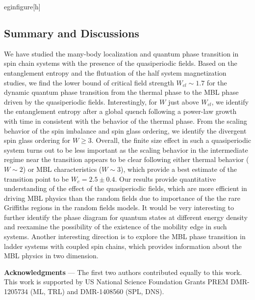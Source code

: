 \documentclass[prl,aps,epsf,showpacs,twocolumn,letterpaper]{revtex4}
\begin{document}
egin{figure}[h]

\subsection{Summary and Discussions}

We have studied the many-body localization and quantum phase transition in spin chain systems with the presence of the quasiperiodic fields.    
Based on the entanglement entropy and the flutuation of the half system magnetization studies, 
we find the lower bound of critical field strength $W_{cl}\sim 1.7$ for 
the dynamic quantum phase  transition from the thermal phase 
to the MBL phase  driven by the quasiperiodic fields. Interestingly,   for $W$ just above $W_{cl}$, we identify the
entanglement entropy after a global quench following a power-law growth with time in consistent with the behavior of the
thermal phase.   From the scaling behavior of the spin imbalance and spin glass ordering, 
we identify the divergent spin glass ordering for $W\geq 3$.    Overall, the finite size effect in such a quasiperiodic system turns
out to be less important as the scaling behavior in the intermediate regime near the transition appears to be clear following either
thermal behavior ($W \sim 2 $) or MBL characteristics ($W\sim 3$), which provide a best estimate of the transition point to be $W_c=2.5\pm 0.4$.  
Our results provide quantitative understanding of the effect of the quasiperiodic fields,  which are more efficient in driving
MBL physics than the random  fields due to importance of the the rare   Griffiths regions in the random
fields models.
It would be very interesting to further identify the phase diagram for quantum states at different energy density and reexamine
the possibility of  the existence of the mobility edge  in such systems.  Another interesting direction is to explore
the MBL phase transition in ladder systems with coupled spin chains, which provides information about the MBL physics
in two dimension.   


                                 

{\bf Acknowledgments} --- The first two authors contributed equally to this
work.  This work is supported by US National Science Foundation  Grants PREM
DMR-1205734 (ML, TRL) and DMR-1408560 (SPL, DNS).
\end{document}
